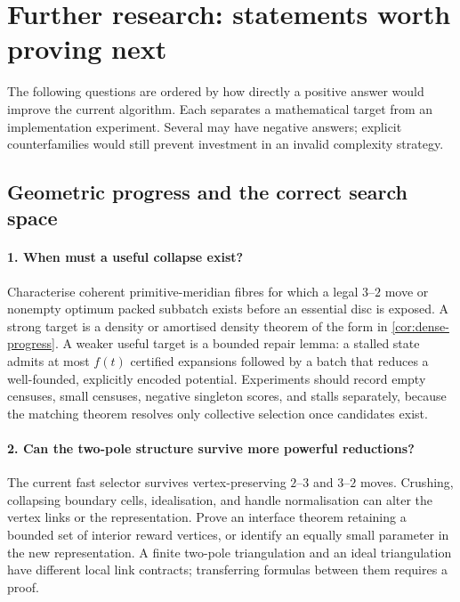 \section{Further research: statements worth proving next}
\label{sec:research}

The following questions are ordered by how directly a positive answer
would improve the current algorithm. Each separates a mathematical target
from an implementation experiment. Several may have negative answers;
explicit counterfamilies would still prevent investment in an invalid
complexity strategy.

\subsection{Geometric progress and the correct search space}

\paragraph{1. When must a useful collapse exist?}
Characterise coherent primitive-meridian fibres for which a legal $3$--$2$
move or nonempty optimum packed subbatch exists before an essential disc
is exposed. A strong target is a density or amortised density theorem of
the form in \cref{cor:dense-progress}. A weaker useful target is a bounded
repair lemma: a stalled state admits at most $f(t)$ certified expansions
followed by a batch that reduces a well-founded, explicitly encoded
potential. Experiments should record empty censuses, small censuses,
negative singleton scores, and stalls separately, because the matching
theorem resolves only collective selection once candidates exist.

\paragraph{2. Can the two-pole structure survive more powerful reductions?}
The current fast selector survives vertex-preserving $2$--$3$ and $3$--$2$
moves. Crushing, collapsing boundary cells, idealisation, and handle
normalisation can alter the vertex links or the representation. Prove an
interface theorem retaining a bounded set of interior reward vertices,
or identify an equally small parameter in the new representation. A finite
two-pole triangulation and an ideal triangulation have different local
link contracts; transferring formulas between them requires a proof.

